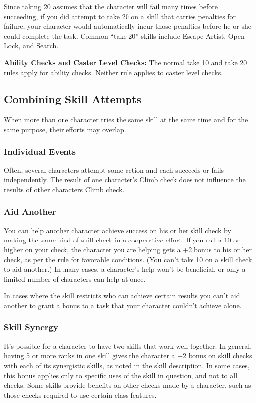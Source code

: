 Since taking 20 assumes that the character will fail many times before succeeding, if you did attempt to take 20 on a skill that carries penalties for failure, your character would automatically incur those penalties before he or she could complete the task. Common ``take 20'' skills include Escape Artist, Open Lock, and Search.

\textbf{Ability Checks and Caster Level Checks:} The normal take 10 and take 20 rules apply for ability checks. Neither rule applies to caster level checks.

\subsection{Combining Skill Attempts}
When more than one character tries the same skill at the same time and for the same purpose, their efforts may overlap.

\subsubsection{Individual Events}
Often, several characters attempt some action and each succeeds or fails independently. The result of one character's Climb check does not influence the results of other characters Climb check.

\subsubsection{Aid Another}
You can help another character achieve success on his or her skill check by making the same kind of skill check in a cooperative effort. If you roll a 10 or higher on your check, the character you are helping gets a +2 bonus to his or her check, as per the rule for favorable conditions. (You can't take 10 on a skill check to aid another.) In many cases, a character's help won't be beneficial, or only a limited number of characters can help at once.

In cases where the skill restricts who can achieve certain results you can't aid another to grant a bonus to a task that your character couldn't achieve alone.

\subsubsection{Skill Synergy}
It's possible for a character to have two skills that work well together. In general, having 5 or more ranks in one skill gives the character a +2 bonus on skill checks with each of its synergistic skills, as noted in the skill description. In some cases, this bonus applies only to specific uses of the skill in question, and not to all checks. Some skills provide benefits on other checks made by a character, such as those checks required to use certain class features.


